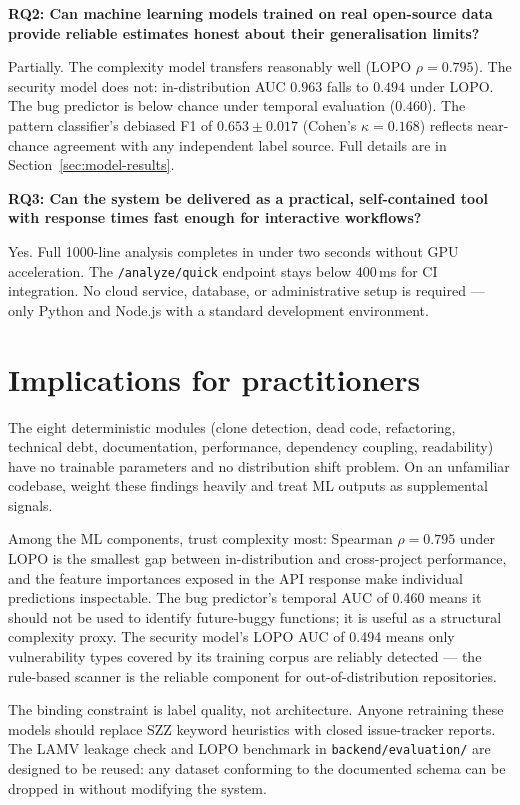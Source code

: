 \documentclass[12pt, oneside]{report}
\begin{document}
\textbf{RQ2: Can machine learning models trained on real open-source data provide reliable estimates honest about their generalisation limits?}

Partially. The complexity model transfers reasonably well (LOPO $\rho = 0.795$). The security model does not: in-distribution AUC $0.963$ falls to $0.494$ under LOPO. The bug predictor is below chance under temporal evaluation ($0.460$). The pattern classifier's debiased F1 of $0.653 \pm 0.017$ (Cohen's $\kappa = 0.168$) reflects near-chance agreement with any independent label source. Full details are in Section~\ref{sec:model-results}.

\textbf{RQ3: Can the system be delivered as a practical, self-contained tool with response times fast enough for interactive workflows?}

Yes. Full 1000-line analysis completes in under two seconds without GPU acceleration. The \texttt{/analyze/quick} endpoint stays below 400\,ms for CI integration. No cloud service, database, or administrative setup is required — only Python and Node.js with a standard development environment.

\section{Implications for practitioners}
\label{sec:implications}

The eight deterministic modules (clone detection, dead code, refactoring, technical debt, documentation, performance, dependency coupling, readability) have no trainable parameters and no distribution shift problem. On an unfamiliar codebase, weight these findings heavily and treat ML outputs as supplemental signals.

Among the ML components, trust complexity most: Spearman $\rho = 0.795$ under LOPO is the smallest gap between in-distribution and cross-project performance, and the feature importances exposed in the API response make individual predictions inspectable. The bug predictor's temporal AUC of 0.460 means it should not be used to identify future-buggy functions; it is useful as a structural complexity proxy. The security model's LOPO AUC of 0.494 means only vulnerability types covered by its training corpus are reliably detected — the rule-based scanner is the reliable component for out-of-distribution repositories.

The binding constraint is label quality, not architecture. Anyone retraining these models should replace SZZ keyword heuristics with closed issue-tracker reports. The LAMV leakage check and LOPO benchmark in \texttt{backend/evaluation/} are designed to be reused: any dataset conforming to the documented schema can be dropped in without modifying the system.
\end{document}
